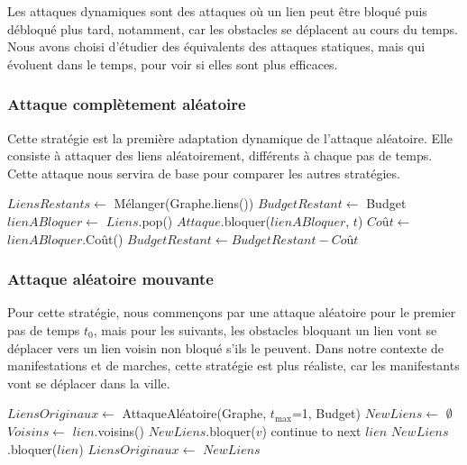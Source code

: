 Les attaques dynamiques sont des attaques où un lien peut être bloqué puis débloqué plus tard, notamment, car les obstacles se déplacent au cours du temps.
Nous avons choisi d'étudier des équivalents des attaques statiques, mais qui évoluent dans le temps, pour voir si elles sont plus efficaces.

\subsubsection{Attaque complètement aléatoire}\label{subsubsec:attaque_aleatoire}

Cette stratégie est la première adaptation dynamique de l'attaque aléatoire.
Elle consiste à attaquer des liens aléatoirement, différents à chaque pas de temps.
Cette attaque nous servira de base pour comparer les autres stratégies.
\begin{algorithm}[H]
\caption{Attaque complètement aléatoire}
\begin{algorithmic}
        \State $LiensRestants \gets$ Mélanger(Graphe.liens())
        \State $BudgetRestant \gets$ Budget
            \State $lienABloquer \gets$ $Liens$.pop()
            \State $Attaque$.bloquer($lienABloquer$, $t$)
            \State $Coût \gets$ $lienABloquer$.Coût()
            \State $BudgetRestant \gets BudgetRestant - Coût$
        \EndWhile
    \EndFor
\end{algorithmic}
\end{algorithm}

\subsubsection{Attaque aléatoire mouvante}\label{subsubsec:attaque_mouvante}

Pour cette stratégie, nous commençons par une attaque aléatoire pour le premier pas de temps ${t_{0}}$, mais pour les suivants, les obstacles bloquant un lien vont se déplacer vers un lien voisin non bloqué s'ils le peuvent.
Dans notre contexte de manifestations et de marches, cette stratégie est plus réaliste, car les manifestants vont se déplacer dans la ville.
\begin{algorithm}[H]
\caption{Attaque mouvante}
\begin{algorithmic}
    \State $LiensOriginaux \gets$ AttaqueAléatoire(Graphe, ${t_{\max}}$=1, Budget)
        \State $NewLiens \gets$ $\emptyset$
            \State $Voisins \gets$ $lien$.voisins()
                    \State $NewLiens$.bloquer($v$)
                    \State continue to next $lien$
                \EndIf
            \EndFor
            \State $NewLiens$.bloquer($lien$)
        \EndFor
        \State $LiensOriginaux \gets$ $NewLiens$
    \EndFor
\end{algorithmic}
\end{algorithm}

